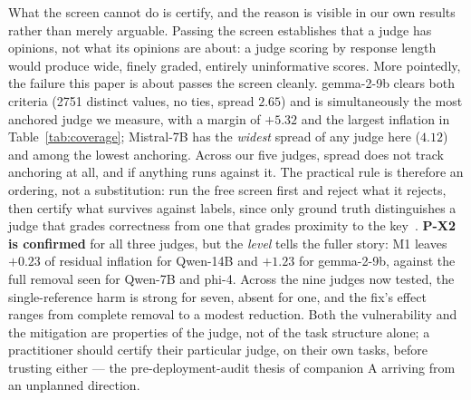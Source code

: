 \documentclass[11pt]{article}
\begin{document}
What the screen cannot do is certify, and the reason is visible in our own results rather than merely arguable.
Passing the screen establishes that a judge has opinions, not what its opinions are about: a judge scoring by response length would produce wide, finely graded, entirely uninformative scores.
More pointedly, the failure this paper is about passes the screen cleanly.
gemma-2-9b clears both criteria (2751 distinct values, no ties, spread $2.65$) and is simultaneously the most anchored judge we measure, with a margin of $+5.32$ and the largest inflation in Table~\ref{tab:coverage}; Mistral-7B has the \emph{widest} spread of any judge here ($4.12$) and among the lowest anchoring.
Across our five judges, spread does not track anchoring at all, and if anything runs against it.
The practical rule is therefore an ordering, not a substitution: run the free screen first and reject what it rejects, then certify what survives against labels, since only ground truth distinguishes a judge that grades correctness from one that grades proximity to the key~\cite{companionA}.
\textbf{P-X2 is confirmed} for all three judges, but the \emph{level} tells the fuller story: M1 leaves $+0.23$ of residual inflation for Qwen-14B and $+1.23$ for gemma-2-9b, against the full removal seen for Qwen-7B and phi-4.
Across the nine judges now tested, the single-reference harm is strong for seven, absent for one, and the fix's effect ranges from complete removal to a modest reduction.
Both the vulnerability and the mitigation are properties of the judge, not of the task structure alone; a practitioner should certify their particular judge, on their own tasks, before trusting either — the pre-deployment-audit thesis of companion A arriving from an unplanned direction.
\end{document}
